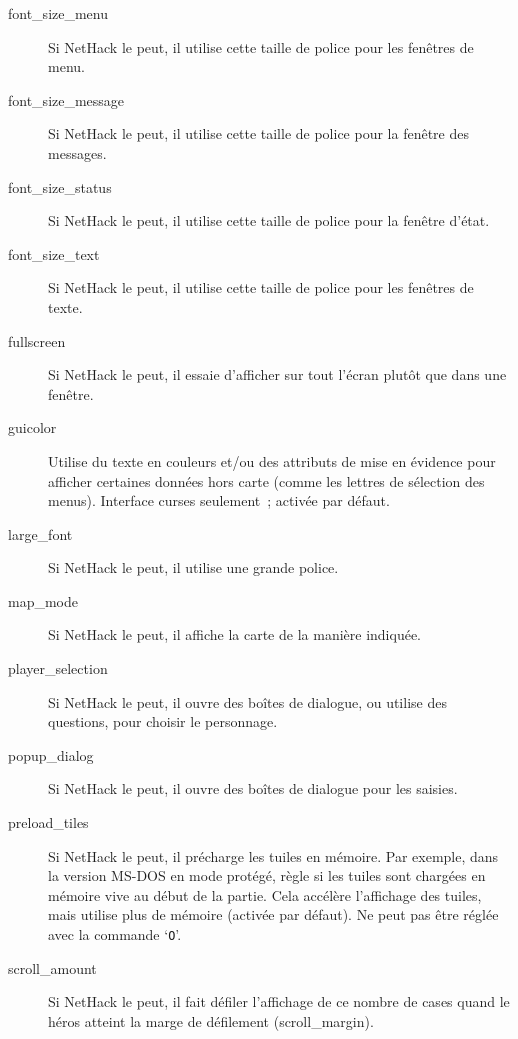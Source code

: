 \documentclass[titlepage]{article}
\begin{document}
\begin{description}
\item[{font\_size\_menu}]
Si NetHack le peut, il utilise cette taille de police pour les fenêtres de
menu.

\item[{font\_size\_message}]
Si NetHack le peut, il utilise cette taille de police pour la fenêtre des
messages.

\item[{font\_size\_status}]
Si NetHack le peut, il utilise cette taille de police pour la fenêtre
d'état.

\item[{font\_size\_text}]
Si NetHack le peut, il utilise cette taille de police pour les fenêtres de
texte.

\item[{fullscreen}]
Si NetHack le peut, il essaie d'afficher sur tout l'écran plutôt que dans
une fenêtre.

\item[{guicolor}]
Utilise du texte en couleurs et/ou des attributs de mise en évidence pour
afficher certaines données hors carte (comme les lettres de sélection des
menus).
Interface curses seulement~; activée par défaut.

\item[{large\_font}]
Si NetHack le peut, il utilise une grande police.

\item[{map\_mode}]
Si NetHack le peut, il affiche la carte de la manière indiquée.

\item[{player\_selection}]
Si NetHack le peut, il ouvre des boîtes de dialogue, ou utilise des
questions, pour choisir le personnage.

\item[{popup\_dialog}]
Si NetHack le peut, il ouvre des boîtes de dialogue pour les saisies.

\item[{preload\_tiles}]
Si NetHack le peut, il précharge les tuiles en mémoire.
Par exemple, dans la version MS-DOS en mode protégé, règle si les tuiles
sont chargées en mémoire vive au début de la partie.
Cela accélère l'affichage des tuiles, mais utilise plus de mémoire
(activée par défaut).
Ne peut pas être réglée avec la commande `\texttt{O}'.

\item[{scroll\_amount}]
Si NetHack le peut, il fait défiler l'affichage de ce nombre de cases quand
le héros atteint la marge de défilement (scroll\_margin).


\end{description}
\end{document}
